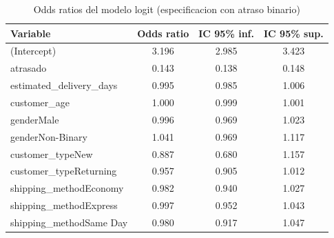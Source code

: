 \begin{table}[htbp]
\centering
\caption{Odds ratios del modelo logit (especificacion con atraso binario)}
\label{tab:logitorrob}
\begin{tabular}{lccc}
\toprule
Variable & Odds ratio & IC 95\% inf. & IC 95\% sup. \\
\midrule
(Intercept) & 3.196 & 2.985 & 3.423 \\
atrasado & 0.143 & 0.138 & 0.148 \\
estimated\_delivery\_days & 0.995 & 0.985 & 1.006 \\
customer\_age & 1.000 & 0.999 & 1.001 \\
genderMale & 0.996 & 0.969 & 1.023 \\
genderNon-Binary & 1.041 & 0.969 & 1.117 \\
customer\_typeNew & 0.887 & 0.680 & 1.157 \\
customer\_typeReturning & 0.957 & 0.905 & 1.012 \\
shipping\_methodEconomy & 0.982 & 0.940 & 1.027 \\
shipping\_methodExpress & 0.997 & 0.952 & 1.043 \\
shipping\_methodSame Day & 0.980 & 0.917 & 1.047 \\
\bottomrule
\end{tabular}
\end{table}

